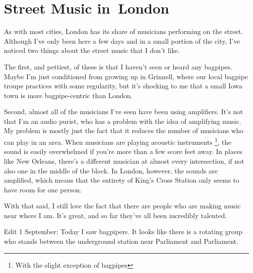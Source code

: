 \hypertarget{street-music-in-london.html}{%
\section{Street Music in~London}\label{street-music-inlondon}}

As with most cities, London has its share of musicians performing on the
street. Although I've only been here a few days and in a small portion
of the city, I've noticed two things about the street music that I don't
like.

The first, and pettiest, of these is that I haven't seen or heard any
bagpipes. Maybe I'm just conditioned from growing up in Grinnell, where
our local bagpipe troupe practices with some regularity, but it's
shocking to me that a small Iowa town is more bagpipe-centric than
London.

Second, almost all of the musicians I've seen have been using
amplifiers. It's not that I'm an audio purist, who has a problem with
the idea of amplifying music. My problem is mostly just the fact that it
reduces the number of musicians who can play in an area. When musicians
are playing acoustic instruments \footnote{With the slight exception of
  bagpipes}, the sound is easily overwhelmed if you're more than a few
score feet away. In places like New Orleans, there's a different
musician at almost every intersection, if not also one in the middle of
the block. In London, however, the sounds are amplified, which means
that the entirety of King's Cross Station only seems to have room for
one person.

With that said, I still love the fact that there are people who are
making music near where I am. It's great, and so far they've all been
incredibly talented.

Edit 1 September: Today I saw bagpipers. It looks like there is a
rotating group who stands between the underground station near
Parliament and Parliament.
